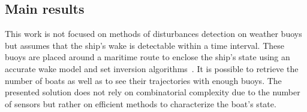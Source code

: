 \documentclass[14pt, a4paper]{article}
\begin{document}
	\subsection*{Main results}
		This work is not focused on methods of disturbances detection on weather buoys but assumes that the ship's wake is detectable within a time interval. These buoys are placed around a maritime route to enclose the ship's state using an accurate wake model and set inversion algorithms~\cite{JaulinWalter93SetInvAutom}. It is possible to retrieve the number of boats as well as to see their trajectories with enough buoys. The presented solution does not rely on combinatorial complexity due to the number of sensors but rather on efficient methods to characterize the boat's state.
		
	\printbibliography[title={References},heading=subbibliography]

	\medskip
\end{document}
